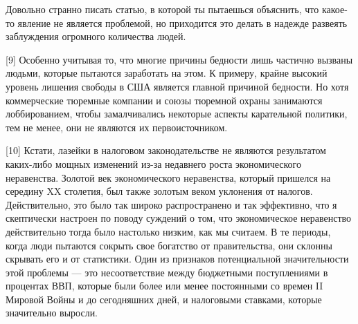 \documentclass[ebook,12pt,oneside,openany]{memoir}
\begin{document}
Довольно странно писать статью, в которой ты пытаешься объяснить, что
какое-то явление не является проблемой, но приходится это делать в
надежде развеять заблуждения огромного количества людей.

[9] Особенно учитывая то, что многие причины бедности лишь частично
вызваны людьми, которые пытаются заработать на этом. К примеру, крайне
высокий уровень лишения свободы в США является главной причиной
бедности. Но хотя коммерческие тюремные компании и союзы тюремной
охраны занимаются лоббированием, чтобы замалчивались некоторые аспекты
карательной политики, тем не менее, они не являются их
первоисточником.

[10] Кстати, лазейки в налоговом законодательстве не являются
результатом каких-либо мощных изменений из-за недавнего роста
экономического неравенства. Золотой век экономического неравенства,
который пришелся на середину XX столетия, был также золотым веком
уклонения от налогов. Действительно, это было так широко
распространено и так эффективно, что я скептически настроен по поводу
суждений о том, что экономическое неравенство действительно тогда было
настолько низким, как мы считаем. В те периоды, когда люди пытаются
сокрыть свое богатство от правительства, они склонны скрывать его и от
статистики. Один из признаков потенциальной значительности этой
проблемы — это несоответствие между бюджетными поступлениями в
процентах ВВП, которые были более или менее постоянными со времен II
Мировой Войны и до сегодняшних дней, и налоговыми ставками, которые
значительно выросли.
\end{document}
